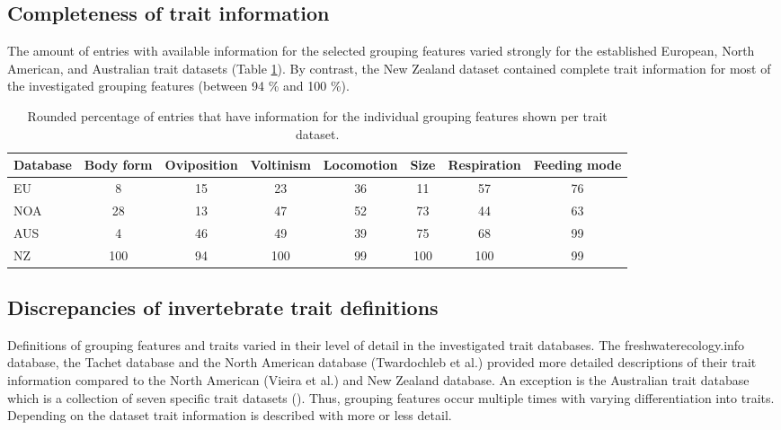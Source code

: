 \documentclass{article}
\begin{document}

\subsection*{Completeness of trait information}

The amount of entries with available information for the selected grouping features varied strongly for the established European, North American, and Australian trait datasets (Table \ref{tab:trait_coverage}). By contrast, the New Zealand dataset contained complete trait information for most of the investigated grouping features (between 94 \% and 100 \%).

\begin{table}[ht]
    \centering
    \caption{Rounded percentage of entries that have 
    information for the individual grouping features
    shown per trait dataset.} 
    \label{tab:trait_coverage}
    \begin{tabular}{lccccccc}
    \toprule[.1em]
    Database & Body form & Oviposition & Voltinism & Locomotion & Size & Respiration & Feeding mode \\ 
    \toprule[.1em]
    EU & 8 & 15 & 23 & 36 & 11 & 57 & 76 \\ 
    NOA & 28 & 13 & 47 & 52 & 73 & 44 & 63 \\ 
    AUS & 4 & 46 & 49 & 39 & 75 & 68 & 99 \\ 
    NZ & 100 & 94 & 100 & 99 & 100 & 100 & 99 \\ 
    \bottomrule
    \end{tabular}
\end{table}

\newpage


\subsection*{Discrepancies of invertebrate trait definitions}

Definitions of grouping features and traits varied in their level of detail in the investigated trait databases. The freshwaterecology.info database, the Tachet database and the North American database (Twardochleb et al.) provided more detailed descriptions of their trait information compared to the North American (Vieira et al.) and New Zealand database. An exception is the Australian trait database which is a collection of seven specific trait datasets (\cite{kefford_integrated_2020}). Thus, grouping features occur multiple times with varying differentiation into traits. Depending on the dataset trait information is described with more or less detail.
\end{document}
